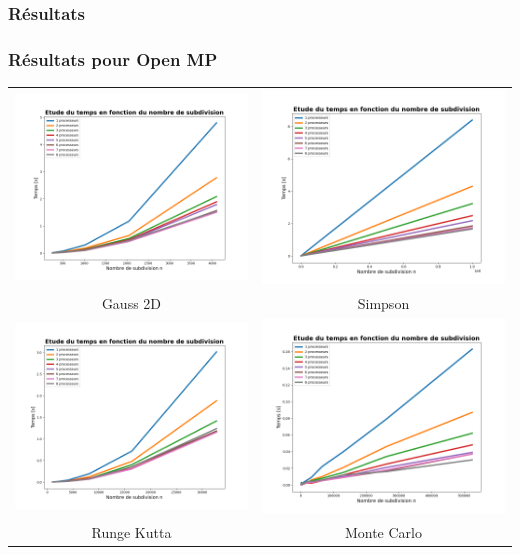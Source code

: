 \documentclass[10pt]{beamer}
\begin{document}
\begin{frame}
    \frametitle{Résultats}
    \tableofcontents[currentsection]
\end{frame}

\begin{frame}
    \frametitle{Résultats pour Open MP}
        \small
    \begin{tabular}{cc}
        \includegraphics[width=0.45\linewidth]{../Images/time_gauss_Op_MP.png} &
        \includegraphics[width=0.45\linewidth]{../Images/time_simp_Op_MP.png} \\
        Gauss 2D & Simpson \\
        \includegraphics[width=0.45\linewidth]{../Images/time_RK_Op_MP.png} &
        \includegraphics[width=0.45\linewidth]{../Images/time_montecarlo_Op_MP.png} \\
        Runge Kutta & Monte Carlo \\
    \end{tabular}
        

\end{frame}
\end{document}

